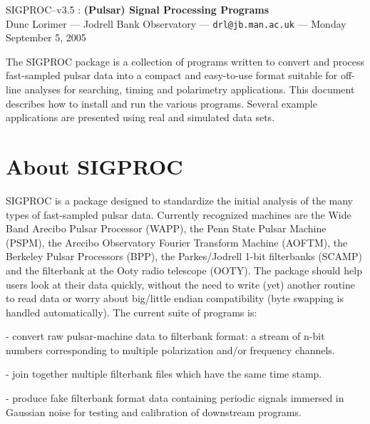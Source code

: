 \documentclass[11pt]{article}
\begin{document}
\begin{center}
{\LARGE {\sc SIGPROC--v3.5} : {\bf (Pulsar) Signal Processing Programs}}\\
\bigskip
\bigskip
{\large Dunc Lorimer --- Jodrell Bank Observatory --- {\tt drl@jb.man.ac.uk} --- Monday September 5, 2005}
\end{center}
 The SIGPROC package is a collection of
programs written to convert and process fast-sampled pulsar data into
a compact and easy-to-use format suitable for off-line analyses for
searching, timing and polarimetry applications. This document
describes how to install and run the various programs. Several example
applications are presented using real and simulated data sets.
\tableofcontents

\clearpage
\section{About SIGPROC}

SIGPROC is a package designed to standardize the initial analysis of
the many types of fast-sampled pulsar data. Currently recognized
machines are the Wide Band Arecibo Pulsar Processor (WAPP), the Penn
State Pulsar Machine (PSPM), the Arecibo Observatory Fourier Transform
Machine (AOFTM), the Berkeley Pulsar Processors (BPP), the Parkes/Jodrell
1-bit filterbanks (SCAMP) and the
filterbank at the Ooty radio telescope (OOTY). The package
should help users look at their data quickly, without the need to
write (yet) another routine to read data or worry about big/little
  
endian compatibility (byte swapping is handled automatically).  The
current suite of programs is:

\bigskip
{} - convert raw pulsar-machine data to 
filterbank format: a stream of n-bit numbers corresponding to multiple
polarization and/or frequency channels. 

\smallskip
{} - join together multiple filterbank
files which have the same time stamp.

\smallskip
{} - produce fake filterbank format data
containing periodic signals immersed in Gaussian noise for
testing and calibration of downstream programs.
\end{document}
